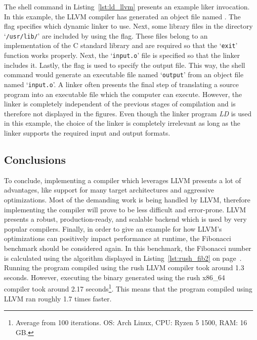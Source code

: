 The shell command in Listing~\ref{lst:ld_llvm} presents an example liker invocation.
In this example, the LLVM compiler has generated an object file named .
The flag  specifies which dynamic linker to use.
Next, some library files in the directory `\texttt{/usr/lib/}' are included by using the \mbox{} flag.
These files belong to an implementation of the C standard library and are required so that the `\texttt{exit}' function works properly.
Next, the `\texttt{input.o}' file is specified so that the linker includes it.
Lastly, the  flag is used to specify the output file.
This way, the shell command would generate an executable file named `\texttt{output}' from an object file named `\texttt{input.o}'.
A linker often presents the final step of translating a source program into an executable file which the computer can execute.
However, the linker is completely independent of the previous stages of compilation and is therefore not displayed in the figures.
Even though the linker program \emph{LD} is used in this example,
the choice of the linker is completely irrelevant as long as the linker supports the required input and output formats.


\subsection{Conclusions}

To conclude, implementing a compiler which leverages LLVM presents a lot of advantages,
like support for many target architectures and aggressive optimizations.
Most of the demanding work is being handled by LLVM, therefore implementing the compiler will prove to be less difficult and error-prone.
LLVM presents a robust, production-ready, and scalable backend which is used by very popular compilers.
Finally, in order to give an example for how LLVM's optimizations can positively impact performance at runtime, the Fibonacci benchmark should be considered again.
In this benchmark, the  Fibonacci number is calculated using the algorithm displayed in Listing~\ref{lst:rush_fib2} on page~\pageref{lst:rush_fib2}.
Running the program compiled using the rush LLVM compiler took around 1.3 seconds.
However, executing the binary generated using the rush x86\_64 compiler took around 2.17 seconds\footnote{Average from 100 iterations. OS\@: Arch Linux, CPU\@: Ryzen 5 1500, RAM\@: 16 GB.}.
This means that the program compiled using LLVM ran roughly 1.7 times faster.
